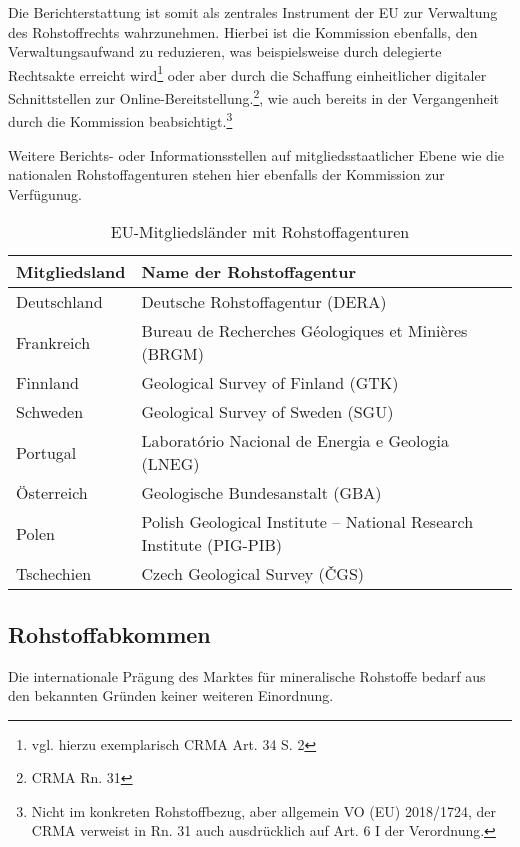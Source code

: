 \documentclass[12pt,a4paper,oneside]{book} %
\begin{document}
	Die Berichterstattung ist somit als zentrales Instrument der EU zur Verwaltung des Rohstoffrechts wahrzunehmen. Hierbei ist die Kommission ebenfalls, den Verwaltungsaufwand zu reduzieren, was beispielsweise durch delegierte Rechtsakte erreicht wird\footnote{vgl. hierzu exemplarisch CRMA Art. 34 S. 2} oder aber durch die Schaffung einheitlicher digitaler Schnittstellen zur Online-Bereitstellung.\footnote{CRMA Rn. 31}, wie auch bereits in der Vergangenheit durch die Kommission beabsichtigt.\footnote{Nicht im konkreten Rohstoffbezug, aber allgemein VO (EU) 2018/1724, der CRMA verweist in Rn. 31 auch ausdrücklich auf Art. 6 I der Verordnung.}
	
	Weitere Berichts- oder Informationsstellen auf mitgliedsstaatlicher Ebene wie die nationalen Rohstoffagenturen stehen hier ebenfalls der Kommission zur Verfügunug.
	\begin{table}[h!]
		\centering
		\begin{tabular}{|l|l|}
			\hline
			\textbf{Mitgliedsland} & \textbf{Name der Rohstoffagentur} \\ \hline
			Deutschland            & Deutsche Rohstoffagentur (DERA) \\ \hline
			Frankreich             & Bureau de Recherches Géologiques et Minières (BRGM) \\ \hline
			Finnland               & Geological Survey of Finland (GTK) \\ \hline
			Schweden               & Geological Survey of Sweden (SGU) \\ \hline
			Portugal               & Laboratório Nacional de Energia e Geologia (LNEG) \\ \hline
			Österreich             & Geologische Bundesanstalt (GBA) \\ \hline
			Polen                  & Polish Geological Institute – National Research Institute (PIG-PIB) \\ \hline
			Tschechien             & Czech Geological Survey (ČGS) \\ \hline
		\end{tabular}
		\caption{EU-Mitgliedsländer mit Rohstoffagenturen}
		\label{tab:rohstoffagenturen}
	\end{table}
	
	
	

	
	
	
\subsection{Rohstoffabkommen}
Die internationale Prägung des Marktes für mineralische Rohstoffe bedarf aus den bekannten Gründen keiner weiteren Einordnung.
\end{document}
